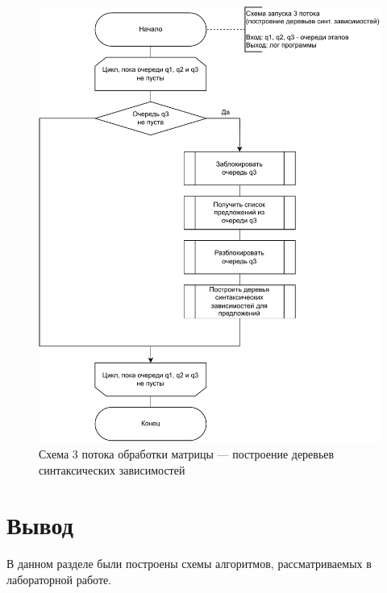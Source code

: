 \begin{figure}[h!]
	\centering
	\includegraphics[width=0.78\linewidth]{img/thread3}
	\caption{Схема 3 потока обработки матрицы --- построение деревьев синтаксических зависимостей}
	\label{fig:thread3}
\end{figure}



\section{Вывод}

В данном разделе были построены схемы алгоритмов, рассматриваемых в лабораторной работе.
